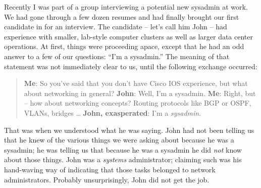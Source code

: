 



\noindent{}Recently I was part of a group interviewing a potential new sysadmin at
work. We had gone through a few dozen resumes and had finally brought our first
candidate in for an interview. The candidate -- let’s call him John -- had
experience with smaller, lab-style computer clusters as well as larger data
center operations. At first, things were proceeding apace, except that he had an
odd answer to a few of our questions: ``I’m a sysadmin.''
The meaning of that statement was not immediately clear to us, until the
following exchange occurred:
\begin{quote}
\textbf{Me}: So you’ve said that you don’t have Cisco IOS experience, but what about
networking in general?\newline
\textbf{John}: Well, I’m a sysadmin.\newline
\textbf{Me}: Right, but -- how about networking concepts? Routing protocols like BGP or
OSPF, VLANs, bridges \dots \newline
\textbf{John, exasperated}: I’m a \emph{sysadmin}.
\end{quote}
That was when we understood what he was saying. John had not been telling us that he knew
of the various things we were asking about because he was a sysadmin; he was
telling us that because he was a sysadmin he did \emph{not} know about those things.
John was a \emph{systems} administrator; claiming such was his hand-waving way of
indicating that those tasks belonged to network administrators.
Probably unsurprisingly, John did not get the job.

